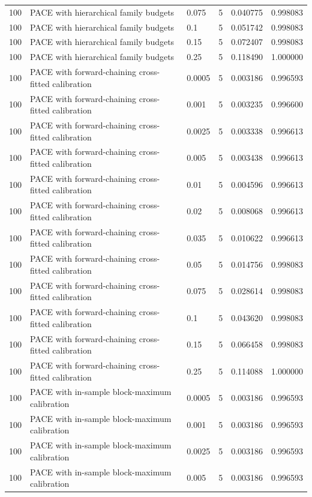 \begin{tabular}{llllll}
100 & PACE with hierarchical family budgets & 0.075 & 5 & 0.040775 & 0.998083 \\
100 & PACE with hierarchical family budgets & 0.1 & 5 & 0.051742 & 0.998083 \\
100 & PACE with hierarchical family budgets & 0.15 & 5 & 0.072407 & 0.998083 \\
100 & PACE with hierarchical family budgets & 0.25 & 5 & 0.118490 & 1.000000 \\
100 & PACE with forward-chaining cross-fitted calibration & 0.0005 & 5 & 0.003186 & 0.996593 \\
100 & PACE with forward-chaining cross-fitted calibration & 0.001 & 5 & 0.003235 & 0.996600 \\
100 & PACE with forward-chaining cross-fitted calibration & 0.0025 & 5 & 0.003338 & 0.996613 \\
100 & PACE with forward-chaining cross-fitted calibration & 0.005 & 5 & 0.003438 & 0.996613 \\
100 & PACE with forward-chaining cross-fitted calibration & 0.01 & 5 & 0.004596 & 0.996613 \\
100 & PACE with forward-chaining cross-fitted calibration & 0.02 & 5 & 0.008068 & 0.996613 \\
100 & PACE with forward-chaining cross-fitted calibration & 0.035 & 5 & 0.010622 & 0.996613 \\
100 & PACE with forward-chaining cross-fitted calibration & 0.05 & 5 & 0.014756 & 0.998083 \\
100 & PACE with forward-chaining cross-fitted calibration & 0.075 & 5 & 0.028614 & 0.998083 \\
100 & PACE with forward-chaining cross-fitted calibration & 0.1 & 5 & 0.043620 & 0.998083 \\
100 & PACE with forward-chaining cross-fitted calibration & 0.15 & 5 & 0.066458 & 0.998083 \\
100 & PACE with forward-chaining cross-fitted calibration & 0.25 & 5 & 0.114088 & 1.000000 \\
100 & PACE with in-sample block-maximum calibration & 0.0005 & 5 & 0.003186 & 0.996593 \\
100 & PACE with in-sample block-maximum calibration & 0.001 & 5 & 0.003186 & 0.996593 \\
100 & PACE with in-sample block-maximum calibration & 0.0025 & 5 & 0.003186 & 0.996593 \\
100 & PACE with in-sample block-maximum calibration & 0.005 & 5 & 0.003186 & 0.996593 \\

\end{tabular}

